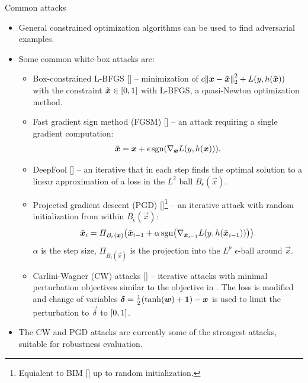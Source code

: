 \documentclass{beamer}
\newcommand{\citet}[1]{{\color{citecolor}\relscale{0.8}\textcite{#1}}}
\newcommand{\citep}[1]{{\color{citecolor}\relscale{0.8}[\textcite{#1}]}}
\begin{document}
\begin{frame}[allowframebreaks=0.9]{Common attacks}
	\begin{itemize}
		\item General constrained optimization algorithms can be used to find adversarial examples.
		\item Some common white-box attacks are:
		\begin{itemize}
			\item Box-constrained L-BFGS \citep{Szegedy:2013:IPNN} -- minimization of $c\enVert{\vec x -\tilde{\vec x}}_2^2+L(y,h(\tilde{\vec x}))$ with the constraint $\tilde{\vec x}\in\intcc{0,1}$ with L-BFGS, a quasi-Newton optimization method.
			\item Fast gradient sign method (FGSM) \citep{Goodfellow:2014:EHAE} -- an attack requiring a single gradient computation:
			\begin{align}
			\tilde{\vec x} = \vec x + \epsilon\sgn\del{\nabla_{\vec x} L(y,h(\vec x))} \text{.}
			\end{align} 
			\item DeepFool \citep{Moosavi-Dezfooli:2016:DFSAMFDNN} -- an iterative that in each step finds the optimal solution to a linear approximation of a loss in the $L^2$ ball $B_\epsilon(\vec x)$.
			\item Projected gradient descent (PGD) \citep{Madry:2017:TDLMRAA}\footnote[frame]{Equialent to BIM \citep{Kurakin:2016:AMLS} up to random initialization.} -- an iterative attack with random initialization from within $B_\epsilon(\vec x)$:
			\begin{equation} \label{eq:pgd}
			\tilde{\vec x}_i = \Pi_{B_\epsilon(\vec x)} \del{\tilde{\vec x}_{i-1} + \alpha\sgn\del{\nabla_{\tilde{\vec x}_{i-1}} L(y,h(\tilde{\vec x}_{i-1}))}} \text{.}
			\end{equation}
			$\alpha$ is the step size, $\Pi_{B_\epsilon(\vec x)}$ is the projection into the $L^p$ $\epsilon$-ball around $\vec x$.
			\item Carlini-Wagner (CW) attacks \citep{Carlini:2017:TERNN} --  iterative attacks with  minimal perturbation objectives similar to the objective in \citet{Szegedy:2013:IPNN}
			. The loss is modified and change of variables $\vec\delta=\frac{1}{2}\del{\tanh\del{\vec w} + \cvec 1} - \vec x$ is used to limit the perturbation to $\vec\delta$ to $\intcc{0,1}$. 
		\end{itemize}
		\item The CW and PGD attacks are currently some of the strongest attacks, suitable for robustness evaluation.		
	\end{itemize}
\end{frame}
\end{document}
